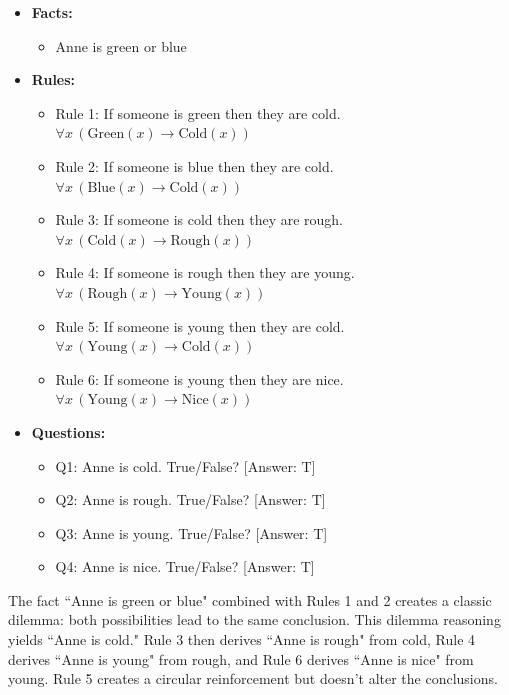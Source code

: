 \documentclass{article}
\begin{document}
\begin{itemize}
    \item \textbf{Facts:}
    \begin{itemize}
        \item Anne is green or blue
    \end{itemize}

    \item \textbf{Rules:}
    \begin{itemize}
        \item Rule 1: If someone is green then they are cold. $\forall x \, (\text{Green}(x) \rightarrow \text{Cold}(x))$
        \item Rule 2: If someone is blue then they are cold. $\forall x \, (\text{Blue}(x) \rightarrow \text{Cold}(x))$
        \item Rule 3: If someone is cold then they are rough. $\forall x \, (\text{Cold}(x) \rightarrow \text{Rough}(x))$
        \item Rule 4: If someone is rough then they are young. $\forall x \, (\text{Rough}(x) \rightarrow \text{Young}(x))$
        \item Rule 5: If someone is young then they are cold. $\forall x \, (\text{Young}(x) \rightarrow \text{Cold}(x))$
        \item Rule 6: If someone is young then they are nice. $\forall x \, (\text{Young}(x) \rightarrow \text{Nice}(x))$
    \end{itemize}

    \item \textbf{Questions:}
    \begin{itemize}
        \item Q1: Anne is cold. True/False? [Answer: T]
        \item Q2: Anne is rough. True/False? [Answer: T]
        \item Q3: Anne is young. True/False? [Answer: T]
        \item Q4: Anne is nice. True/False? [Answer: T]
    \end{itemize}
\end{itemize}

The fact ``Anne is green or blue" combined with Rules 1 and 2 creates a classic dilemma: both possibilities lead to the same conclusion. This dilemma reasoning yields  ``Anne is cold." Rule 3 then derives ``Anne is rough" from cold, Rule 4 derives ``Anne is young" from rough, and Rule 6 derives ``Anne is nice" from young. Rule 5 creates a circular reinforcement but doesn't alter the conclusions.
\end{document}
